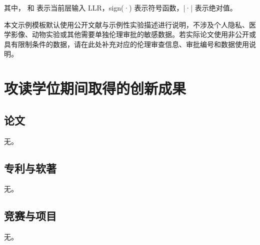 \documentclass[a4paper,AutoFakeBold,openright,12pt]{book}
\begin{document}
其中， 和  表示当前层输入 LLR，sign(·) 表示符号函数，|·| 表示绝对值。

本文示例模板默认使用公开文献与示例性实验描述进行说明，不涉及个人隐私、医学影像、动物实验或其他需要单独伦理审批的敏感数据。若实际论文使用非公开或具有限制条件的数据，请在此处补充对应的伦理审查信息、审批编号和数据使用说明。

\cleardoublepage
\chapter*{攻读学位期间取得的创新成果}
{}

\section*{论文}
无。

\section*{专利与软著}
无。

\section*{竞赛与项目}
无。
\end{document}
